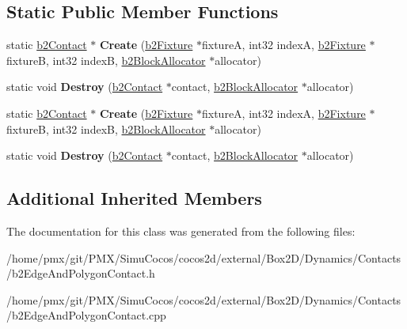 \subsection*{Static Public Member Functions}
\begin{DoxyCompactItemize}
\item 
\mbox{\label{classb2EdgeAndPolygonContact_a3a0bcb2327e02bfc2079a734d8e9c8f7}} 
static \hyperlink{classb2Contact}{b2\+Contact} $\ast$ {\bfseries Create} (\hyperlink{classb2Fixture}{b2\+Fixture} $\ast$fixtureA, int32 indexA, \hyperlink{classb2Fixture}{b2\+Fixture} $\ast$fixtureB, int32 indexB, \hyperlink{classb2BlockAllocator}{b2\+Block\+Allocator} $\ast$allocator)
\item 
\mbox{\label{classb2EdgeAndPolygonContact_a83260c190706928518ab1a3040c0c515}} 
static void {\bfseries Destroy} (\hyperlink{classb2Contact}{b2\+Contact} $\ast$contact, \hyperlink{classb2BlockAllocator}{b2\+Block\+Allocator} $\ast$allocator)
\item 
\mbox{\label{classb2EdgeAndPolygonContact_a43c450ab34c63cb7dca91ed04a6bacaf}} 
static \hyperlink{classb2Contact}{b2\+Contact} $\ast$ {\bfseries Create} (\hyperlink{classb2Fixture}{b2\+Fixture} $\ast$fixtureA, int32 indexA, \hyperlink{classb2Fixture}{b2\+Fixture} $\ast$fixtureB, int32 indexB, \hyperlink{classb2BlockAllocator}{b2\+Block\+Allocator} $\ast$allocator)
\item 
\mbox{\label{classb2EdgeAndPolygonContact_aefebb57eb58fa87a609033b0d4991a66}} 
static void {\bfseries Destroy} (\hyperlink{classb2Contact}{b2\+Contact} $\ast$contact, \hyperlink{classb2BlockAllocator}{b2\+Block\+Allocator} $\ast$allocator)
\end{DoxyCompactItemize}
\subsection*{Additional Inherited Members}


The documentation for this class was generated from the following files\+:\begin{DoxyCompactItemize}
\item 
/home/pmx/git/\+P\+M\+X/\+Simu\+Cocos/cocos2d/external/\+Box2\+D/\+Dynamics/\+Contacts/b2\+Edge\+And\+Polygon\+Contact.\+h\item 
/home/pmx/git/\+P\+M\+X/\+Simu\+Cocos/cocos2d/external/\+Box2\+D/\+Dynamics/\+Contacts/b2\+Edge\+And\+Polygon\+Contact.\+cpp\end{DoxyCompactItemize}
